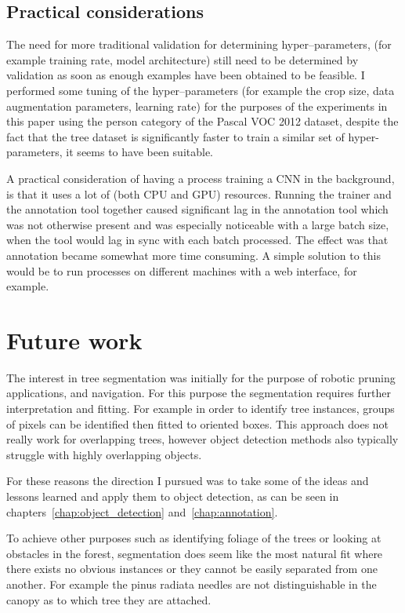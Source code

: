 \subsection{Practical considerations}

The need for more traditional validation for determining hyper--parameters, (for example training rate, model architecture) still need to be determined by validation as soon as enough examples have been obtained to be feasible. I performed some tuning of the hyper--parameters (for example the crop size, data augmentation parameters, learning rate) for the purposes of the experiments in this paper using the person category of the Pascal \gls{VOC} 2012 dataset, despite the fact that the tree dataset is significantly faster to train a similar set of hyper-parameters, it seems to have been suitable.


A practical consideration of having a process training a \gls{CNN} in the background, is that it uses a lot of (both \gls{CPU} and \gls{GPU}) resources. Running the trainer and the annotation tool together caused significant lag in the annotation tool which was not otherwise present and was especially noticeable with a large batch size, when the tool would lag in sync with each batch processed. The effect was that annotation became somewhat more time consuming. A simple solution to this would be to run processes on different machines with a web interface, for example.


\section{Future work}

The interest in tree segmentation was initially for the purpose of robotic pruning applications, and navigation. For this purpose the segmentation requires further interpretation and fitting. For example in order to identify tree instances, groups of pixels can be identified then fitted to oriented boxes. This approach does not really work for overlapping trees, however object detection methods also typically struggle with highly overlapping objects.

For these reasons the direction I pursued was to take some of the ideas and lessons learned and apply them to object detection, as can be seen in chapters~\ref {chap:object_detection} and~\ref {chap:annotation}.

To achieve other purposes such as identifying foliage of the trees or looking at obstacles in the forest, segmentation does seem like the most natural fit where there exists no obvious instances or they cannot be easily separated from one another. For example the pinus radiata needles are not distinguishable in the canopy as to which tree they are attached.

